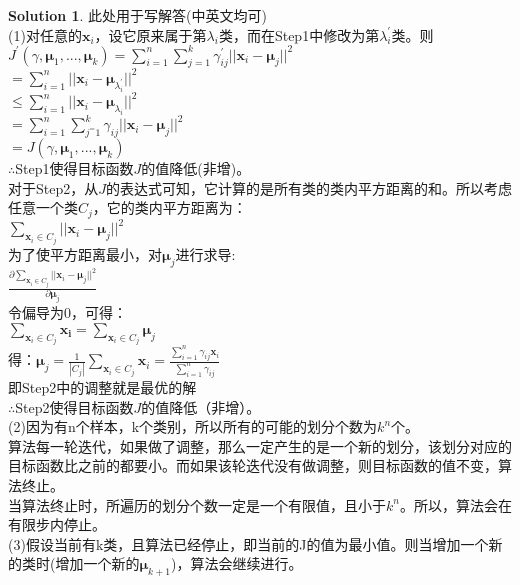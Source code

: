 \documentclass[a4paper,UTF8]{article}
\numberwithin{equation}{section}
\theoremstyle{definition}
\newtheorem*{solution}{Solution}
\begin{document}
\begin{solution}
此处用于写解答(中英文均可)\\
(1)对任意的$\mathbf{x}_i$，设它原来属于第$\lambda_i$类，而在Step1中修改为第$\lambda_i^{'}$类。则\\
$J^{'}(\gamma, \boldsymbol\mu_1,...,\boldsymbol\mu_k) = \sum_{i=1}^n \sum_{j=1}^k \gamma_{ij}^{'} ||\mathbf{x}_i - \boldsymbol \mu_j ||^2$\\
$ = \sum_{i=1}^n ||\mathbf{x}_i -\boldsymbol\mu_{\lambda_i^{'}}||^2$\\
$ \le \sum_{i=1}^n || \mathbf{x}_i - \boldsymbol\mu_{\lambda_i} ||^2$\\
$ = \sum_{i=1}^n \sum_{j^=1}^k \gamma_{ij}|| \mathbf{x}_i - \boldsymbol\mu_j ||^2$\\
$ = J(\gamma, \boldsymbol\mu_1,...,\boldsymbol\mu_k)$\\
$\therefore$Step1使得目标函数$J$的值降低(非增)。\\
对于Step2，从$J$的表达式可知，它计算的是所有类的类内平方距离的和。所以考虑任意一个类$C_j$，它的类内平方距离为：\\
$\sum_{\mathbf{x}_i\in C_j} || \mathbf{x}_i - \boldsymbol\mu_j ||^2$\\
为了使平方距离最小，对$\boldsymbol\mu_j$进行求导:\\
$\frac{\partial \sum_{\mathbf{x}_i\in C_j} || \mathbf{x}_i - \boldsymbol\mu_j ||^2}{\partial \boldsymbol\mu_j}$\\
令偏导为0，可得：\\
$\sum_{\mathbf{x}_i \in C_j} \mathbf{x_i} = \sum_{\mathbf{x}_i \in C_j} \boldsymbol\mu_j$\\
得：$\boldsymbol\mu_j = \frac{1}{|C_j|} \sum_{\mathbf{x}_i\in C_j} \mathbf{x}_i = \frac{\sum_{i=1}^n \gamma_{ij}\mathbf{x}_i}{\sum_{i=1}^n \gamma_{ij}}$\\
即Step2中的调整就是最优的解\\
$\therefore$Step2使得目标函数$J$的值降低（非增）。\\
(2)因为有n个样本，k个类别，所以所有的可能的划分个数为$k^n$个。\\
算法每一轮迭代，如果做了调整，那么一定产生的是一个新的划分，该划分对应的目标函数比之前的都要小。而如果该轮迭代没有做调整，则目标函数的值不变，算法终止。\\
当算法终止时，所遍历的划分个数一定是一个有限值，且小于$k^n$。所以，算法会在有限步内停止。\\
(3)假设当前有k类，且算法已经停止，即当前的J的值为最小值。则当增加一个新的类时(增加一个新的$\boldsymbol\mu_{k+1}$)，算法会继续进行。\\

\end{solution}
\end{document}
